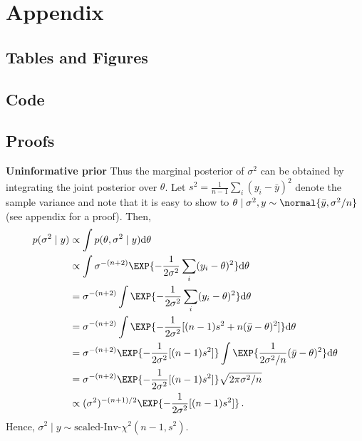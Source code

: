 \appendix
\section{Appendix}

\subsection{Tables and Figures}

\subsection{Code}

\subsection{Proofs}
\textbf{Uninformative prior}
Thus the marginal posterior of $\sigma^2$ can be obtained by integrating the joint posterior
over $\theta$. Let $s^2 = \frac{1}{n-1} \sum_i (y_i - \bar{y})^2$ denote the sample
variance and note that it is easy to show to
$\theta \mid \sigma^2, y \sim \normal{\bar{y}, \sigma^2/n}$ (see appendix for a proof).
Then,
\begin{align}
  p(\sigma^2 \mid y) &\propto \int p(\theta, \sigma^2 \mid y) \mathrm{d} \theta\\
  &\propto \int \sigma^{-(n+2)} \EXP{-\frac{1}{2\sigma^2}\sum_i (y_i - \theta)^2} \mathrm{d} \theta\\
  &= \sigma^{-(n+2)} \int \EXP{-\frac{1}{2\sigma^2}\sum_i (y_i - \theta)^2} \mathrm{d} \theta\\
  &= \sigma^{-(n+2)} \int \EXP{-\frac{1}{2\sigma^2}[(n-1) s^2 + n(\bar{y} - \theta)^2]} \mathrm{d} \theta\\
  &= \sigma^{-(n+2)} \EXP{-\frac{1}{2\sigma^2}[(n-1) s^2]} \int \EXP{\frac{1}{2\sigma^2/n}(\bar{y} - \theta)^2} \mathrm{d} \theta\\
  &= \sigma^{-(n+2)} \EXP{-\frac{1}{2\sigma^2}[(n-1) s^2]} \sqrt{2 \pi \sigma^2 / n} \\
  &\propto (\sigma^2)^{-(n+1)/2} \EXP{-\frac{1}{2\sigma^2}[(n-1) s^2]} \,.
\end{align}
Hence, $\sigma^2 \mid y \sim \text{scaled-Inv-} \chi^2(n-1, s^2)$.

